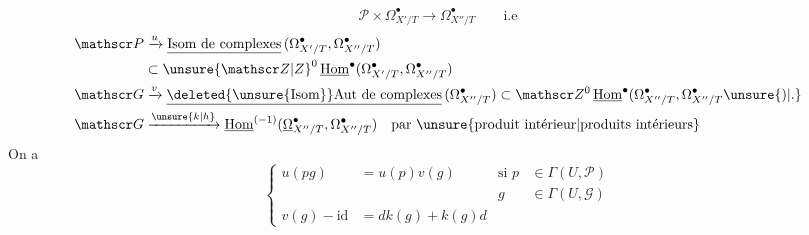 \[
 \mathscr P\times\Omega^\bullet_{X'/T}\longrightarrow\Omega^\bullet_{X''/T}
 \qquad\text{i.e}
\]
\[
 \begin{aligned}
 \mathscr P&\xrightarrow{u}\underline{\text{Isom de complexes}}\,(\Omega^\bullet_{X'/T},\Omega^\bullet_{X''/T})\\
 &\subset \unsure{\mathscr Z|Z}^0\,\underline{\mathrm{Hom}}^\bullet(\Omega^\bullet_{X'/T},\Omega^\bullet_{X''/T})\\
 \mathscr G&\xrightarrow{v}\underline{\text{\deleted{\unsure{Isom}}Aut de complexes}}\,(\Omega^\bullet_{X''/T})
 \subset\mathscr Z^0\,\underline{\mathrm{Hom}}^\bullet(\Omega^\bullet_{X''/T},\Omega^\bullet_{X''/T}\unsure{)|.}\\
 \mathscr G&\xrightarrow{\unsure{k|h}}\underline{\mathrm{Hom}}^{(-1)}(\underline{\Omega}^\bullet_{X''/T},\Omega^\bullet_{X''/T})
 \quad\text{par \unsure{produit intérieur|produits intérieurs}}
 \end{aligned}
\]
On a
\[
 \left\{\begin{aligned}
 u(pg)&=u(p)v(g)&\text{si }p&\in\Gamma(U,\mathscr P)\\
 && g&\in\Gamma(U,\mathscr G)\\
 v(g)-\mathrm{id}&=dk(g)+k(g)d
 \end{aligned}\right.
\]
